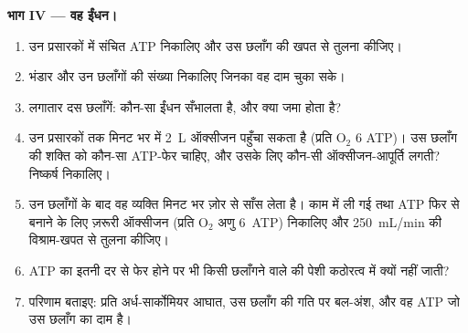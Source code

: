 \begin{problem}
\medskip
\noindent\textbf{भाग IV --- वह ईंधन।}
\begin{enumerate}[resume]
  \item उन प्रसारकों में संचित ATP निकालिए और उस
        छलाँग की खपत से तुलना कीजिए।
  \item {} भंडार और उन छलाँगों की संख्या निकालिए
        जिनका वह दाम चुका सके।
  \item लगातार दस छलाँगें: कौन-सा ईंधन सँभालता है, और क्या
        जमा होता है?
  \item {} उन प्रसारकों तक मिनट भर में \qty{2}{L} ऑक्सीजन
        पहुँचा सकता है (प्रति $\mathrm{O_2}$ 6 ATP)। उस छलाँग की शक्ति को
        कौन-सा ATP-फेर चाहिए, और उसके लिए कौन-सी ऑक्सीजन-आपूर्ति
        लगती? निष्कर्ष निकालिए।
  \item उन छलाँगों के बाद वह व्यक्ति मिनट भर ज़ोर से साँस लेता है।
        काम में ली गई  तथा ATP फिर से बनाने के लिए ज़रूरी ऑक्सीजन
        (प्रति $\mathrm{O_2}$ अणु \qty{6}{ATP}) निकालिए और
        \qty{250}{mL/min} की विश्राम-खपत से तुलना कीजिए।
  \item ATP का इतनी दर से फेर होने पर भी किसी छलाँगने वाले की पेशी
        कठोरत्व में क्यों नहीं जाती?
  \item परिणाम बताइए: प्रति अर्ध-सार्कोमियर आघात, उस छलाँग की गति पर
        बल-अंश, और वह ATP जो उस छलाँग का दाम है।
\end{enumerate}
\end{problem}
